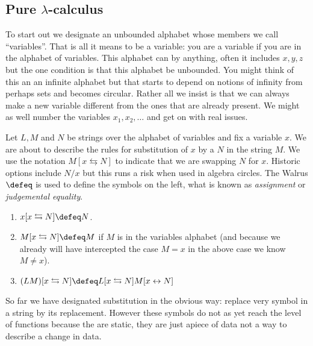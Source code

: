 \subsection{Pure $\lambda$-calculus}

To start out we designate an unbounded alphabet whose members we call ``variables''.
That is all it means to be a variable: you are a variable if you are in the alphabet of variables.  This alphabet 
can by anything, often it includes $x,y,z$ but the one condition is that 
this alphabet be unbounded.  You might think of this an an infinite alphabet but that starts to depend on notions of infinity from perhaps sets and becomes circular.
Rather all we insist is that we can always make a new variable different 
from the ones that are already present.  We might as well number the variables $x_1,x_2,\ldots$ and get on with real issues.

Let $L, M$ and $N$ be strings over the alphabet of variables
and fix a variable $x$.  We are about to describe the rules for substitution 
of $x$ by a $N$ in the string $M$.  We use the notation $M[x\leftrightarrows N]$ 
to indicate that we are swapping $N$ for $x$.  Historic 
options include $N/x$ but this runs a risk when used in algebra circles.
The Walrus $\defeq$ is used to define the symbols on the left, what is 
known as \emph{assignment} or \emph{judgemental equality}.  
\begin{enumerate}
    \item $x[x\leftrightarrows N]\defeq N$.
    \item $M[x\leftrightarrows N]\defeq M$ if $M$ is in the variables alphabet (and 
    because we already will have intercepted the case $M=x$ in the above case we know $M\neq x$).
    
    \item $(LM)[x\leftrightarrows N]\defeq L[x\leftrightarrows N]M[x\leftrightarrow N]$
\end{enumerate}
So far we have designated substitution in the obvious way: replace very 
symbol in a string by its replacement.  However these symbols do not as 
yet reach the level of functions because the are static, they are just 
apiece of data not a way to describe a change in data.

